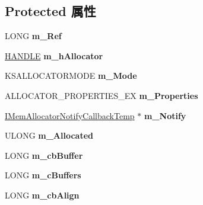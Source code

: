 \subsection*{Protected 属性}
\begin{DoxyCompactItemize}
\item 
\mbox{\label{class_c_ks_allocator_adfa9825fb10566358f6a081d6a80e585}} 
L\+O\+NG {\bfseries m\+\_\+\+Ref}
\item 
\mbox{\label{class_c_ks_allocator_ab4decf0b84939844ff0962106da77898}} 
\hyperlink{interfacevoid}{H\+A\+N\+D\+LE} {\bfseries m\+\_\+h\+Allocator}
\item 
\mbox{\label{class_c_ks_allocator_a8d8f3650e7ef1efc4882720ff2d8201d}} 
K\+S\+A\+L\+L\+O\+C\+A\+T\+O\+R\+M\+O\+DE {\bfseries m\+\_\+\+Mode}
\item 
\mbox{\label{class_c_ks_allocator_af941ef664f57faca99753e9e4f038713}} 
A\+L\+L\+O\+C\+A\+T\+O\+R\+\_\+\+P\+R\+O\+P\+E\+R\+T\+I\+E\+S\+\_\+\+EX {\bfseries m\+\_\+\+Properties}
\item 
\mbox{\label{class_c_ks_allocator_a93fd9ccce3694be340aa4fbba606a0f8}} 
\hyperlink{interface_i_mem_allocator_notify_callback_temp}{I\+Mem\+Allocator\+Notify\+Callback\+Temp} $\ast$ {\bfseries m\+\_\+\+Notify}
\item 
\mbox{\label{class_c_ks_allocator_a806e0eb5268bc01fb0abf8d86e59aab7}} 
U\+L\+O\+NG {\bfseries m\+\_\+\+Allocated}
\item 
\mbox{\label{class_c_ks_allocator_a42418f9c2038c4bcacd9fd0d9629483f}} 
L\+O\+NG {\bfseries m\+\_\+cb\+Buffer}
\item 
\mbox{\label{class_c_ks_allocator_a4f5d9037b652a85554f30b26fb248aa7}} 
L\+O\+NG {\bfseries m\+\_\+c\+Buffers}
\item 
\mbox{\label{class_c_ks_allocator_a3c42301f9e0f278adbf4594cbd86eaf9}} 
L\+O\+NG {\bfseries m\+\_\+cb\+Align}
\item 
\mbox{\label{class_c_ks_allocator_a7957f183013654b0e4548b609e32bac7}} 

\end{DoxyCompactItemize}
